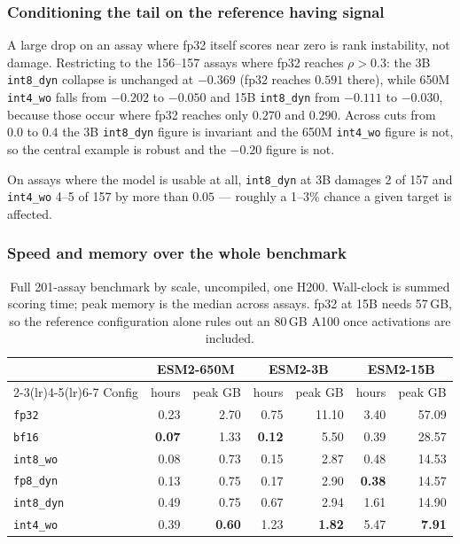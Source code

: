 \documentclass[11pt]{article}
\newcommand{\cfg}[1]{\texttt{#1}}
\begin{document}
\subsubsection{Conditioning the tail on the reference having signal}

A large drop on an assay where fp32 itself scores near zero is rank instability,
not damage. Restricting to the 156--157 assays where fp32 reaches $\rho > 0.3$:
the 3B \cfg{int8\_dyn} collapse is unchanged at $-0.369$ (fp32 reaches $0.591$
there), while 650M \cfg{int4\_wo} falls from $-0.202$ to $-0.050$ and 15B
\cfg{int8\_dyn} from $-0.111$ to $-0.030$, because those occur where fp32
reaches only $0.270$ and $0.290$. Across cuts from $0.0$ to $0.4$ the 3B
\cfg{int8\_dyn} figure is invariant and the 650M \cfg{int4\_wo} figure is not,
so the central example is robust and the $-0.20$ figure is not.

On assays where the model is usable at all, \cfg{int8\_dyn} at 3B damages 2 of
157 and \cfg{int4\_wo} 4--5 of 157 by more than $0.05$ --- roughly a 1--3\%
chance a given target is affected.

\subsubsection{Speed and memory over the whole benchmark}

\begin{table}[htb]
\centering
\caption{Full 201-assay benchmark by scale, uncompiled, one H200. Wall-clock is
summed scoring time; peak memory is the median across assays. fp32 at 15B needs
57\,GB, so the reference configuration alone rules out an 80\,GB A100 once
activations are included.}
\label{tab:speedram3}
\small
\begin{tabular}{lrrrrrr}
\toprule
& \multicolumn{2}{c}{ESM2-650M} & \multicolumn{2}{c}{ESM2-3B} & \multicolumn{2}{c}{ESM2-15B} \\
\cmidrule(lr){2-3}\cmidrule(lr){4-5}\cmidrule(lr){6-7}
Config & hours & peak GB & hours & peak GB & hours & peak GB \\
\midrule
\cfg{fp32}      & 0.23 &  2.70 & 0.75 & 11.10 & 3.40 & 57.09 \\
\cfg{bf16}      & \textbf{0.07} &  1.33 & \textbf{0.12} &  5.50 & 0.39 & 28.57 \\
\cfg{int8\_wo}  & 0.08 &  0.73 & 0.15 &  2.87 & 0.48 & 14.53 \\
\cfg{fp8\_dyn}  & 0.13 &  0.75 & 0.17 &  2.90 & \textbf{0.38} & 14.57 \\
\cfg{int8\_dyn} & 0.49 &  0.75 & 0.67 &  2.94 & 1.61 & 14.90 \\
\cfg{int4\_wo}  & 0.39 &  \textbf{0.60} & 1.23 &  \textbf{1.82} & 5.47 &  \textbf{7.91} \\
\bottomrule
\end{tabular}
\end{table}
\end{document}
